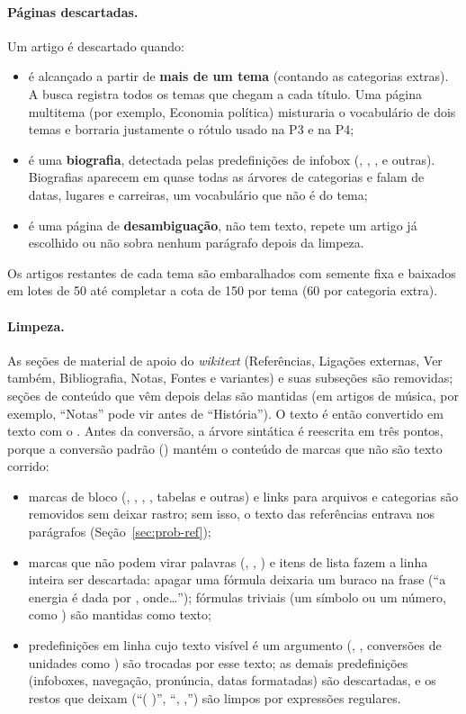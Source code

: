 \paragraph{Páginas descartadas.} Um artigo é descartado quando:
\begin{itemize}
    \item é alcançado a partir de \textbf{mais de um tema} (contando as categorias extras). A
    busca registra todos os temas que chegam a cada título. Uma página multitema (por exemplo,
    Economia política) misturaria o vocabulário de dois temas e borraria justamente o rótulo
    usado na P3 e na P4;
    \item é uma \textbf{biografia}, detectada pelas predefinições de infobox
    (, , ,  e
    outras). Biografias aparecem em quase todas as árvores de categorias e falam de datas,
    lugares e carreiras, um vocabulário que não é do tema;
    \item é uma página de \textbf{desambiguação}, não tem texto, repete um artigo já escolhido
    ou não sobra nenhum parágrafo depois da limpeza.
\end{itemize}
Os artigos restantes de cada tema são embaralhados com semente fixa e baixados em lotes de 50
até completar a cota de 150 por tema (60 por categoria extra).

\paragraph{Limpeza.} As seções de material de apoio do \emph{wikitext} (Referências, Ligações
externas, Ver também, Bibliografia, Notas, Fontes e variantes) e suas subseções são removidas;
seções de conteúdo que vêm depois delas são mantidas (em artigos de música, por exemplo,
``Notas'' pode vir antes de ``História''). O texto é então convertido em texto com o . Antes da conversão, a árvore sintática é
reescrita em três pontos, porque a conversão padrão () mantém o conteúdo de
marcas que não são texto corrido:
\begin{itemize}
    \item marcas de bloco (, , , ,
    tabelas e outras) e links para arquivos e categorias são removidos sem deixar rastro; sem
    isso, o texto das referências entrava nos parágrafos (Seção~\ref{sec:prob-ref});
    \item marcas que não podem virar palavras (, , ) e itens
    de lista fazem a linha inteira ser descartada: apagar uma fórmula deixaria um buraco na
    frase (``a energia é dada por , onde\ldots''); fórmulas triviais (um símbolo ou um número,
    como ) são mantidas como texto;
    \item predefinições em linha cujo texto visível é um argumento (,
    , conversões de unidades como ) são trocadas por esse texto; as
    demais predefinições (infoboxes, navegação, pronúncia, datas formatadas) são descartadas, e
    os restos que deixam (``( )'', ``, ,'') são limpos por expressões regulares.
\end{itemize}

